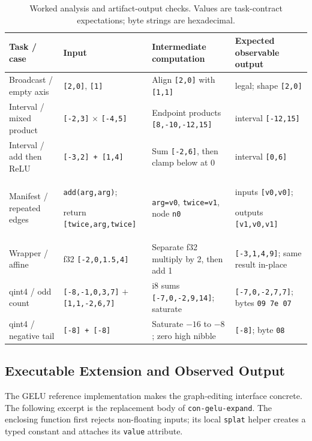 \begin{table}[!htbp]
\centering\scriptsize
\caption{Worked analysis and artifact-output checks. Values are task-contract
expectations; byte strings are hexadecimal.}
\label{tab:worked-outputs}
\setlength{\tabcolsep}{5pt}
\renewcommand{\arraystretch}{1.2}
\begin{tabular}{@{}p{2.6cm}p{4.2cm}p{4.7cm}p{5.0cm}@{}}
\toprule
Task / case & Input & Intermediate computation & Expected observable output \\
\midrule
Broadcast / empty axis &
\texttt{[2,0]}, \texttt{[1]} &
Align \texttt{[2,0]} with \texttt{[1,1]} &
legal; shape \texttt{[2,0]} \\
Interval / mixed product &
\texttt{[-2,3]} $\times$ \texttt{[-4,5]} &
Endpoint products \texttt{[8,-10,-12,15]} &
interval \texttt{[-12,15]} \\
Interval / add then ReLU &
\texttt{[-3,2] + [1,4]} &
Sum \texttt{[-2,6]}, then clamp below at 0 &
interval \texttt{[0,6]} \\
Manifest / repeated edges &
\texttt{add(arg,arg)};\par return \texttt{[twice,arg,twice]} &
\texttt{arg=v0}, \texttt{twice=v1}, node \texttt{n0} &
inputs \texttt{[v0,v0]};\par outputs \texttt{[v1,v0,v1]} \\
Wrapper / affine &
f32 \texttt{[-2,0,1.5,4]} &
Separate f32 multiply by 2, then add 1 &
\texttt{[-3,1,4,9]}; same result in-place \\
qint4 / odd count &
\texttt{[-8,-1,0,3,7]} $+$ \texttt{[1,1,-2,6,7]} &
i8 sums \texttt{[-7,0,-2,9,14]}; saturate &
\texttt{[-7,0,-2,7,7]}; bytes \texttt{09 7e 07} \\
qint4 / negative tail &
\texttt{[-8] + [-8]} &
Saturate $-16$ to $-8$; zero high nibble &
\texttt{[-8]}; byte \texttt{08} \\
\bottomrule
\end{tabular}
\end{table}

\clearpage
\subsection{Executable Extension and Observed Output}
\label{sec:extension-code}

The GELU reference implementation makes the graph-editing interface concrete.
The following excerpt is the replacement body of \texttt{con-gelu-expand}.
The enclosing function first rejects non-floating inputs; its local \texttt{splat}
helper creates a typed constant and attaches its \texttt{value} attribute.

